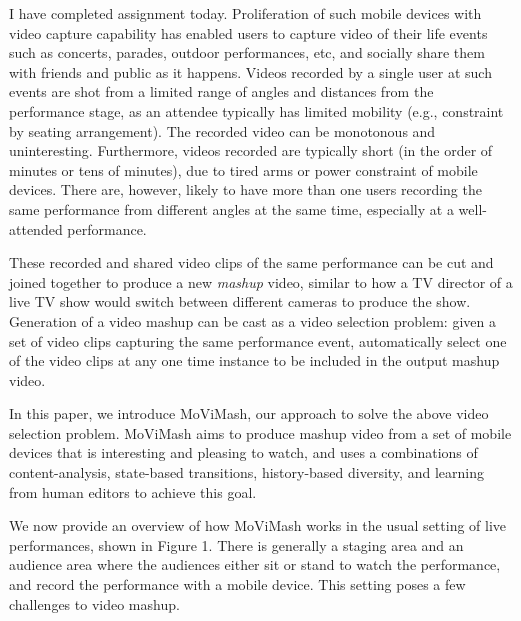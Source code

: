 \documentclass{new}
\begin{document}
I have completed assignment today.
Proliferation of such mobile devices with video capture capability
has enabled users to capture video of their life events such
as concerts, parades, outdoor performances, etc, and socially share
them with friends and public as it happens. Videos recorded by
a single user at such events are shot from a limited range of angles
and distances from the performance stage, as an attendee typically
has limited mobility (e.g., constraint by seating arrangement).
The recorded video can be monotonous and uninteresting. Furthermore,
videos recorded are typically short (in the order of minutes
or tens of minutes), due to tired arms or power constraint of mobile
devices. There are, however, likely to have more than one users
recording the same performance from different angles at the same
time, especially at a well-attended performance.

These recorded and shared video clips of the same performance
    can be cut and joined together to produce a new \textit{mashup} video,
similar to how a TV director of a live TV show would switch between
different cameras to produce the show. Generation of a video
mashup can be cast as a video selection problem: given a set of
video clips capturing the same performance event, automatically
select one of the video clips at any one time instance to be included
in the output mashup video.

In this paper, we introduce MoViMash, our approach to solve
the above video selection problem. MoViMash aims to produce
mashup video from a set of mobile devices that is interesting and
pleasing to watch, and uses a combinations of content-analysis,
state-based transitions, history-based diversity, and learning from
human editors to achieve this goal.

We now provide an overview of how MoViMash works in the
usual setting of live performances, shown in Figure 1. There is
generally a staging area and an audience area where the audiences
either sit or stand to watch the performance, and record the performance
with a mobile device. This setting poses a few challenges to
video mashup.
\end{document}
